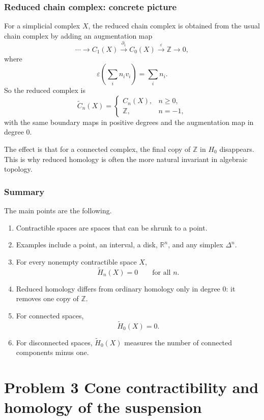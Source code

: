 \documentclass[12pt,a4paper]{article}
\theoremstyle{notespace}
\begin{document}
\subsubsection{Reduced chain complex: concrete picture}

For a simplicial complex \(X\), the reduced chain complex is obtained from the usual chain complex by adding an augmentation map
\[
\cdots \longrightarrow C_1(X)\xrightarrow{\partial_1} C_0(X)\xrightarrow{\varepsilon} \mathbb{Z}\longrightarrow 0,
\]
where
\[
\varepsilon\!\left(\sum_i n_i v_i\right)=\sum_i n_i.
\]
So the reduced complex is
\[
\widetilde{C}_n(X)=
\begin{cases}
	C_n(X), & n\ge 0,\\
	\mathbb{Z}, & n=-1,
\end{cases}
\]
with the same boundary maps in positive degrees and the augmentation map in degree \(0\).

The effect is that for a connected complex, the final copy of \(\mathbb{Z}\) in \(H_0\) disappears. This is why reduced homology is often the more natural invariant in algebraic topology.

\subsubsection{Summary}

The main points are the following.

\begin{enumerate}
	\item Contractible spaces are spaces that can be shrunk to a point.
	\item Examples include a point, an interval, a disk, \(\mathbb{R}^n\), and any simplex \(\Delta^n\).
	\item For every nonempty contractible space \(X\),
	\[
	\widetilde{H}_n(X)=0 \qquad \text{for all } n.
	\]
	\item Reduced homology differs from ordinary homology only in degree \(0\): it removes one copy of \(\mathbb{Z}\).
	\item For connected spaces,
	\[
	\widetilde{H}_0(X)=0.
	\]
	\item For disconnected spaces, \(\widetilde{H}_0(X)\) measures the number of connected components minus one.
\end{enumerate}

\section{Problem 3 Cone contractibility and homology of the suspension}
\end{document}
